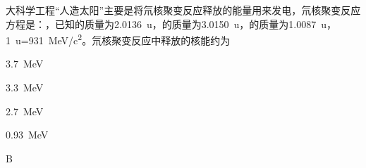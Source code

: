 大科学工程“人造太阳”主要是将氘核聚变反应释放的能量用来发电，氘核聚变反应方程是：，已知的质量为\qty{2.0136}{u}，的质量为\qty{3.0150}{u}，的质量为\qty{1.0087}{u}，\qty{1}{u}=\qty{931}{MeV/c^2}。氘核聚变反应中释放的核能约为\paren[B]
\begin{choices}
	\item \qty{3.7}{MeV}
	\item \qty{3.3}{MeV}
	\item \qty{2.7}{MeV}
	\item \qty{0.93}{MeV}
\end{choices}
\begin{answer}
	B
\end{answer}